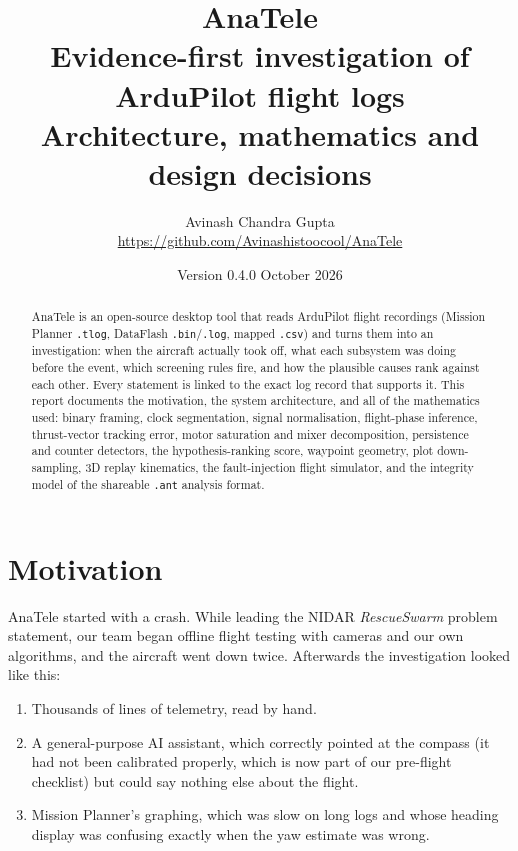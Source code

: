 \documentclass[11pt,a4paper]{article}
\title{\textbf{AnaTele}\\[4pt]\large Evidence-first investigation of ArduPilot flight logs\\[2pt]
\normalsize Architecture, mathematics and design decisions}
\author{Avinash Chandra Gupta\\\small \url{https://github.com/Avinashistoocool/AnaTele}}
\date{Version 0.4.0 \quad October 2026}
\newcommand{\code}[1]{\texttt{#1}}
\begin{document}
\maketitle

\begin{abstract}
AnaTele is an open-source desktop tool that reads ArduPilot flight recordings (Mission Planner
\code{.tlog}, DataFlash \code{.bin}/\code{.log}, mapped \code{.csv}) and turns them into an
investigation: when the aircraft actually took off, what each subsystem was doing before the
event, which screening rules fire, and how the plausible causes rank against each other. Every
statement is linked to the exact log record that supports it. This report documents the
motivation, the system architecture, and all of the mathematics used: binary framing, clock
segmentation, signal normalisation, flight-phase inference, thrust-vector tracking error, motor
saturation and mixer decomposition, persistence and counter detectors, the hypothesis-ranking
score, waypoint geometry, plot down-sampling, 3D replay kinematics, the fault-injection flight
simulator, and the integrity model of the shareable \code{.ant} analysis format.
\end{abstract}

\tableofcontents
\newpage

\section{Motivation}

AnaTele started with a crash. While leading the NIDAR \emph{RescueSwarm} problem statement, our
team began offline flight testing with cameras and our own algorithms, and the aircraft went down
twice. Afterwards the investigation looked like this:

\begin{enumerate}
  \item Thousands of lines of telemetry, read by hand.
  \item A general-purpose AI assistant, which correctly pointed at the compass (it had not been
        calibrated properly, which is now part of our pre-flight checklist) but could say
        nothing else about the flight.
  \item Mission Planner's graphing, which was slow on long logs and whose heading display
        was confusing exactly when the yaw estimate was wrong.
\end{enumerate}
\end{document}
